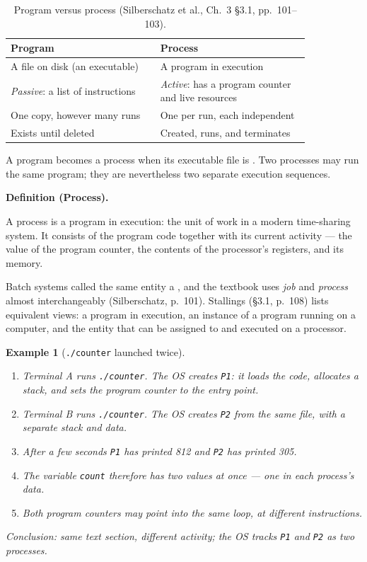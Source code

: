 \documentclass[11pt]{article}
\newtheorem{example}{Example}
\newenvironment{definitionbox}[1]{%
  \par\noindent\textbf{Definition (#1).}\ \itshape
}{\par\vspace{0.3em}}
\begin{document}
\begin{table}[h]
\centering\small
\renewcommand{\arraystretch}{1.3}
\begin{tabular}{@{}>{\raggedright\arraybackslash}p{0.42\linewidth}>{\raggedright\arraybackslash}p{0.42\linewidth}@{}}
\toprule
\textbf{Program} & \textbf{Process} \\
\midrule
A file on disk (an executable) & A program in execution \\
\emph{Passive}: a list of instructions & \emph{Active}: has a program counter and live resources \\
One copy, however many runs & One per run, each independent \\
Exists until deleted & Created, runs, and terminates \\
\bottomrule
\end{tabular}
\caption{Program versus process (Silberschatz et al., Ch.~3 \S3.1, pp.~101--103).}
\label{tab:prog-proc}
\end{table}

A program becomes a process when its executable file is . Two processes may run the same program; they are nevertheless two
separate execution sequences.

\begin{definitionbox}{Process}
A process is a program in execution: the unit of work in a modern time-sharing
system. It consists of the program code together with its current activity ---
the value of the program counter, the contents of the processor's registers,
and its memory.
\end{definitionbox}

Batch systems called the same entity a , and the textbook uses
\emph{job} and \emph{process} almost interchangeably (Silberschatz, p.~101).
Stallings (\S3.1, p.~108) lists equivalent views: a program in execution, an
instance of a program running on a computer, and the entity that can be
assigned to and executed on a processor.

\begin{example}[\texttt{./counter} launched twice]
\begin{enumerate}
  \item Terminal A runs \texttt{./counter}. The OS creates \texttt{P1}: it
        loads the code, allocates a stack, and sets the program counter to the
        entry point.
  \item Terminal B runs \texttt{./counter}. The OS creates \texttt{P2} from
        the \emph{same} file, with a \emph{separate} stack and data.
  \item After a few seconds \texttt{P1} has printed 812 and \texttt{P2} has
        printed 305.
  \item The variable \texttt{count} therefore has two values at once --- one in
        each process's data.
  \item Both program counters may point into the same loop, at different
        instructions.
\end{enumerate}
\emph{Conclusion:} same text section, different activity; the OS tracks
\texttt{P1} and \texttt{P2} as two processes.
\end{example}
\end{document}

